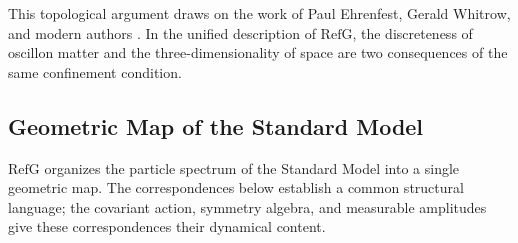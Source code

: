 \documentclass[11pt,a4paper]{article}
\newcommand{\RefG}{\mathrm{RefG}}
\begin{document}
This topological argument draws on the work of Paul Ehrenfest, Gerald Whitrow, and modern authors \citep{ehrenfest1918,whitrow1955,berera2017}. In the unified description of $\RefG$, the discreteness of oscillon matter and the three-dimensionality of space are two consequences of the same confinement condition.

\subsection{Geometric Map of the Standard Model}

$\RefG$ organizes the particle spectrum of the Standard Model into a single geometric map. The correspondences below establish a common structural language; the covariant action, symmetry algebra, and measurable amplitudes give these correspondences their dynamical content.
\end{document}
